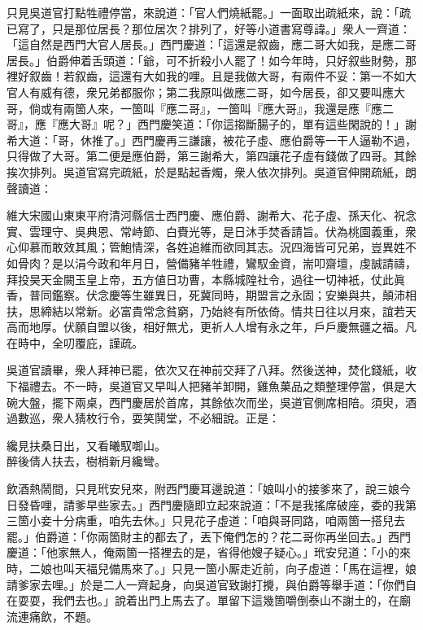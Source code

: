 只見吳道官打點牲禮停當，來說道：「官人們燒紙罷。」一面取出疏紙來，說：「疏已寫了，只是那位居長？那位居次？排列了，好等小道書寫尊諱。」衆人一齊道：「這自然是西門大官人居長。」{}西門慶道：「這還是叙齒，應二哥大如我，是應二哥居長。」伯爵伸着舌頭道：「爺，可不折殺小人罷了！{}如今年時，只好叙些財勢，那裡好叙齒！{}若叙齒，這還有大如我的哩。且是我做大哥，有兩件不妥：第一不如大官人有威有德，{}衆兄弟都服你；第二我原叫做應二哥，如今居長，卻又要叫應大哥，倘或有兩箇人來，一箇叫『應二哥』，一箇叫『應大哥』，我還是應『應二哥』，應『應大哥』呢？」西門慶笑道：「你這搊斷腸子的，單有這些閑說的！」謝希大道：「哥，休推了。」西門慶再三謙讓，被花子虛、應伯爵等一干人逼勒不過，只得做了大哥。第二便是應伯爵，第三謝希大，第四讓花子虛有錢做了四哥。其餘挨次排列。吳道官寫完疏紙，於是點起香燭，衆人依次排列。吳道官伸開疏紙，朗聲讀道：

\begin{myquote}[\markfont]
維大宋國山東東平府清河縣信士西門慶、應伯爵、謝希大、花子虛、孫天化、祝念實、雲理守、吳典恩、常峙節、白賚光等，是日沐手焚香請旨。伏為桃園義重，衆心仰慕而敢效其風；管鮑情深，各姓追維而欲同其志。況四海皆可兄弟，豈異姓不如骨肉？是以涓今政和年月日，營備豬羊牲禮，鸞馭金資，耑叩齋壇，虔誠請禱，拜投昊天金闕玉皇上帝，五方値日功曹，本縣城隍社令，過往一切神衹，仗此眞香，普同鑑察。伏念慶等生雖異日，死冀同時，期盟言之永固；安樂與共，顛沛相扶，思締結以常新。必富貴常念貧窮，乃始終有所依倚。情共日往以月來，誼若天高而地厚。伏願自盟以後，相好無尤，更祈人人增有永之年，戶戶慶無疆之福。凡在時中，全叨覆庇，謹疏。

\end{myquote}

吳道官讀畢，衆人拜神已罷，依次又在神前交拜了八拜。然後送神，焚化錢紙，收下福禮去。不一時，吳道官又早叫人把豬羊卸開，雞魚菓品之類整理停當，俱是大碗大盤，擺下兩桌，西門慶居於首席，其餘依次而坐，吳道官側席相陪。須臾，酒過數巡，衆人猜枚行令，耍笑鬨堂，不必細說。正是：

\begin{myquote}
纔見扶桑日出，又看曦馭啣山。\\
醉後倩人扶去，樹梢新月纔彎。
\end{myquote}

飲酒熱鬧間，只見玳安兒來，附西門慶耳邊說道：「娘叫小的接爹來了，說三娘今日發昏哩，請爹早些家去。」西門慶隨即立起來說道：「不是我搖席破座，委的我第三箇小妾十分病重，咱先去休。」只見花子虛道：「咱與哥同路，咱兩箇一搭兒去罷。」伯爵道：「你兩箇財主的都去了，{}丟下俺們怎的？花二哥你再坐回去。」西門慶道：「他家無人，俺兩箇一搭裡去的是，省得他嫂子疑心。」玳安兒道：「小的來時，二娘也叫天福兒備馬來了。」只見一箇小厮走近前，向子虛道：「馬在這裡，娘請爹家去哩。」於是二人一齊起身，向吳道官致謝打攪，與伯爵等舉手道：「你們自在耍耍，我們去也。」說着出門上馬去了。單留下這幾箇嚼倒泰山不謝土的，在廟流連痛飲，不題。

